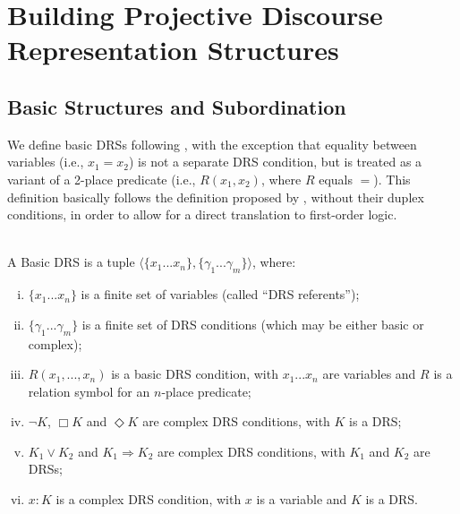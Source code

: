 \section{Building Projective Discourse Representation Structures}
\label{sec:building}


\subsection{Basic Structures and Subordination}

We define basic DRSs following , with the
exception that equality between variables (i.e., $x_1=x_2$) is not
a separate DRS condition, but is treated as a variant of a 2-place predicate
(i.e., $R(x_1,x_2)$, where $R$ equals $=$). This definition basically
follows the definition proposed by , without
their duplex conditions, in order to allow for a direct translation to
first-order logic.

\begin{definition} \label{def:bDRS}~\\
A Basic DRS is a tuple $\langle \{x_1 ... x_n\},\{\gamma_1 ... \gamma_m\} 
\rangle$, where:
 \begin{enumerate}[i.]
  \item $\{x_1 ... x_n\}$ is a finite set of variables (called ``DRS
    referents'');
  \item $\{\gamma_1 ... \gamma_m\}$ is a finite set of DRS conditions (which
    may be either basic or complex);
  \item\label{def:bDRS:Rel} $R(x_1, ..., x_n)$ is a basic DRS condition,
    with $x_1 ... x_n$ are variables and $R$ is a relation symbol for an
    $n$-place predicate;
  \item $\neg K$, $\Box K$ and $\Diamond K$ are complex DRS conditions, with
    $K$ is a DRS;
  \item $K_1 \vee K_2$ and $K_1 \Rightarrow K_2$ are complex DRS conditions,
    with $K_1$ and $K_2$ are DRSs;
  \item \label{def:bDRS:Prop} $x:K$ is a complex DRS condition, with $x$ is
    a variable and $K$ is a DRS.
 \end{enumerate} 
\end{definition}


